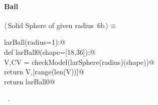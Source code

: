 \documentclass[11pt,oneside]{article}	%
\begin{document}
\paragraph{Ball}
\begin{flushleft} \small \label{scrap12}
\protect{}$\langle\,$Solid Sphere of given radius\nobreak\ {\footnotesize 6b}$\,\rangle\equiv$
\vspace{-1ex}
\begin{list}{}{} \item
\mbox{}\verb@def larBall(radius=1):@\\
\mbox{}\verb@   def larBall0(shape=[18,36]):@\\
\mbox{}\verb@      V,CV = checkModel(larSphere(radius)(shape))@\\
\mbox{}\verb@      return V,[range(len(V))]@\\
\mbox{}\verb@   return larBall0@\\
\mbox{}\verb@@{\NWsep}
\end{list}
\vspace{-1ex}
\footnotesize\addtolength{\baselineskip}{-1ex}
\begin{list}{}{\setlength{\itemsep}{-\parsep}\setlength{\itemindent}{-\leftmargin}}
\item \NWtxtMacroRefIn\ .
\end{list}
\end{flushleft}
\end{document}
